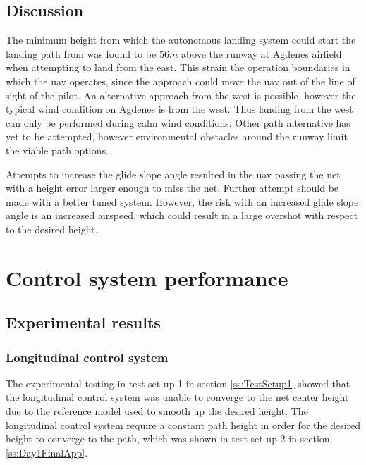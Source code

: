 \subsection{Discussion}
The minimum height from which the autonomous landing system could start the landing path from was found to be $56 m$ above the runway at Agdenes airfield when attempting to land from the east. This strain the operation boundaries in which the \gls{uav} operates, since the approach could move the \gls{uav} out of the line of sight of the pilot. An alternative approach from the west is possible, however the typical wind condition on Agdenes is from the west. Thus landing from the west can only be performed during calm wind conditions. Other path alternative has yet to be attempted, however environmental obstacles around the runway limit the viable path options.

Attempts to increase the glide slope angle resulted in the \gls{uav} passing the net with a height error larger enough to miss the net. Further attempt should be made with a better tuned system. However, the risk with an increased glide slope angle is an increased airspeed, which could result in a large overshot with respect to the desired height.
\section{Control system performance}\label{ss:EvaluationControl}
\subsection{Experimental results}
\subsubsection{Longitudinal control system}
The experimental testing in test set-up 1 in section \ref{ss:TestSetup1} showed that the longitudinal control system was unable to converge to the net center height due to the reference model used to smooth up the desired height. The longitudinal control system require a constant path height in order for the desired height to converge to the path, which was shown in test set-up 2 in section \ref{ss:Day1FinalApp}.


